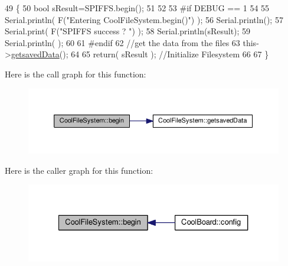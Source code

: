 \begin{DoxyCode}
49 \{
50     \textcolor{keywordtype}{bool} sResult=SPIFFS.begin();
51     
52 
53 \textcolor{preprocessor}{#if DEBUG == 1}
54 
55     Serial.println( F(\textcolor{stringliteral}{"Entering CoolFileSystem.begin()"}) );
56     Serial.println();   
57     Serial.print( F(\textcolor{stringliteral}{"SPIFFS success ? "}) );
58     Serial.println(sResult);
59     Serial.println(  );
60 
61 \textcolor{preprocessor}{#endif}
62     \textcolor{comment}{//get the data from the files}
63     this->\hyperlink{class_cool_file_system_a70701d05e811604af1b531f4f6dc69ed}{getsavedData}();
64 
65     \textcolor{keywordflow}{return}( sResult  );                                   \textcolor{comment}{//Initialize Filesystem}
66 
67 \}
\end{DoxyCode}
Here is the call graph for this function\+:\nopagebreak
\begin{figure}[H]
\begin{center}
\leavevmode
\includegraphics[width=350pt]{db/d0c/class_cool_file_system_a6ba6f666ed4c530174f8569d2c636748_cgraph}
\end{center}
\end{figure}
Here is the caller graph for this function\+:\nopagebreak
\begin{figure}[H]
\begin{center}
\leavevmode
\includegraphics[width=327pt]{db/d0c/class_cool_file_system_a6ba6f666ed4c530174f8569d2c636748_icgraph}
\end{center}
\end{figure}
\mbox{\label{class_cool_file_system_a13f2958f5b87757c31fc53797a30d23a}} 
